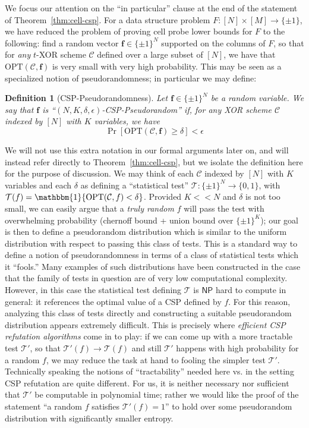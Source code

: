 \documentclass[11pt]{article}
\newtheorem{definition}{Definition}
\newcommand{\B}{\{0,1\}}
\newcommand{\Opt}{\mathrm{OPT}}
\newcommand{\N}{[N]}
\begin{document}
We focus our attention on the ``in particular'' clause at the end of the statement of Theorem~\ref{thm:cell-csp}. For a data structure problem $F: [N] \times [M] \to \{\pm 1\}$, we have reduced the problem of proving cell probe lower bounds for $F$ to the following: find a random vector $\bm{f} \in \{\pm 1\}^N$ supported on the columns of $F$, so that for \emph{any} $t$-XOR scheme $\mathcal{C}$ defined over a large subset of $\N$, we have that $\Opt(\mathcal{C},\bm{f})$ is very small with very high probability. 
This may be seen as a specialized notion of pseudorandomness; in particular we may define:
\begin{definition}[CSP-Pseudorandomness]\label{def:csp-pseudo}
Let $\bm{f} \in \{\pm 1\}^N$ be a random variable. We say that $\bm{f}$ is ``$(N,K,\delta,\epsilon)$-CSP-Pseudorandom'' if, for any XOR scheme $\mathcal{C}$ indexed by $[N]$ with $K$ variables, we have
\[
\Pr[\Opt(\mathcal{C},\bm{f}) \geq \delta] < \epsilon
\]
\end{definition}
We will not use this extra notation in our formal arguments later on, and will instead refer directly to Theorem~\ref{thm:cell-csp}, but we isolate the definition here for the purpose of discussion. We may think of each $\mathcal{C}$ indexed by $\N$ with $K$ variables and each $\delta$ as defining a ``statistical test'' $\mathcal{T}: \{\pm 1\}^N \to \B$, with $\mathcal{T}(f) = \mathbbm{1}\{ \Opt(\mathcal{C},f) < \delta\}$. Provided $K << N$ and $\delta$ is not too small, we can easily argue that a \emph{truly random} $f$ will pass the test with overwhelming probability (chernoff bound + union bound over $\{\pm 1\}^K$); our goal is then to define a pseudorandom distribution which is similar to the uniform distribution with respect to passing this class of tests. This is a standard way to define a notion of pseudorandomness in terms of a class of statistical tests which it ``fools.'' Many examples of such distributions have been constructed in the case that the family of tests in question are of very low computational complexity. However, in this case the statistical test defining $\mathcal{T}$ is $\mathsf{NP}$ hard to compute in general: it references the optimal value of a CSP defined by $f$. For this reason, analyzing this class of tests directly and constructing a suitable pseudorandom distribution appears extremely difficult. This is precisely where \emph{efficient CSP refutation algorithms} come in to play: if we can come up with a more tractable test $\mathcal{T}'$, so that $\mathcal{T}'(f) \rightarrow \mathcal{T}(f)$ and still $\mathcal{T}'$ happens with high probability for a random $f$, we may reduce the task at hand to fooling the simpler test $\mathcal{T}'$. Technically speaking the notions of ``tractability'' needed here vs. in the setting CSP refutation are quite different. For us, it is neither necessary nor sufficient that $\mathcal{T}'$ be computable in polynomial time; rather we would like the proof of the statement ``a random $f$ satisfies $\mathcal{T}'(f)=1$'' to hold over some pseudorandom distribution with significantly smaller entropy. 
\end{document}
